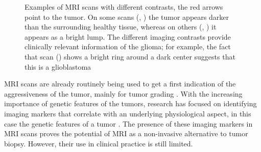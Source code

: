 \begin{figure}[hbt]
    \caption{Examples of \acrshort{MRI} scans with different contrasts, the red arrows point to the \gls{tumor}.
    On some scans (\textbf{\protect{}}, \textbf{\protect{}}) the \gls{tumor} appears darker than the surrounding healthy tissue, whereas on others (\textbf{\protect{}}, \textbf{\protect{}}) it appears as a bright lump.
     The different imaging contrasts provide clinically relevant information of the glioma; for example, the fact that scan (\textbf{\protect{}}) shows a bright ring around a dark center suggests that this is a glioblastoma}\label{fig:intro_MR_example}
\end{figure}

\gls{MRI} scans are already routinely being used to get a first indication of the aggressiveness of the \gls{tumor}, mainly for \gls{tumor} grading \autocite{upadhyay2011MRIevaluation}.
With the increasing importance of genetic features of the \glspl{tumor}, research has focused on identifying imaging markers that correlate with an underlying physiological aspect, in this case the genetic features of a \gls{tumor} \autocite{patel2017mismatch, smits2016imaging}.
The presence of these imaging markers in \gls{MRI} scans proves the potential of \gls{MRI} as a non-invasive alternative to \gls{tumor} biopsy.
However, their use in clinical practice is still limited.

